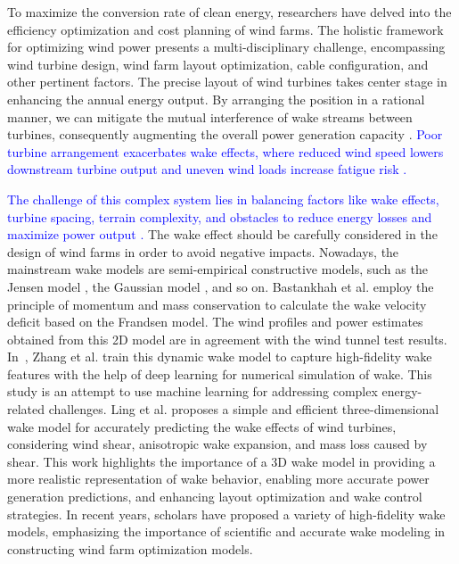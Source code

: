 \documentclass[journal,twoside]{IEEEtran}
\begin{document}
    To maximize the conversion rate of clean energy, researchers have delved into the efficiency optimization and cost planning of wind farms. The holistic framework for optimizing wind power presents a multi-disciplinary challenge, encompassing wind turbine design, wind farm layout optimization, cable configuration, and other pertinent factors. The precise layout of wind turbines takes center stage in enhancing the annual energy output. By arranging the position in a rational manner, we can mitigate the mutual interference of wake streams between turbines, consequently augmenting the overall power generation capacity \cite{howland2022operating}. \textcolor{blue}{Poor turbine arrangement exacerbates wake effects, where reduced wind speed lowers downstream turbine output and uneven wind loads increase fatigue risk \cite{howland2022collective,kitzing2020multifaceted}.} 
    
    \textcolor{blue}{The challenge of this complex system lies in balancing factors like wake effects, turbine spacing, terrain complexity, and obstacles to reduce energy losses and maximize power output \cite{tao2020nonuniform}.} The wake effect should be carefully considered in the design of wind farms in order to avoid negative impacts. Nowadays, the mainstream wake models are semi-empirical constructive models, such as the Jensen model \cite{shakoor2016wake} , the Gaussian model \cite{yu2023reinforcement}, and so on. Bastankhah et al. \cite{bastankhah2014new} employ the principle of momentum and mass conservation to calculate the wake velocity deficit based on the Frandsen model. The wind profiles and power estimates obtained from this 2D model are in agreement with the wind tunnel test results. In~\cite{zhang2020novel}, Zhang et al. train this dynamic wake model to capture high-fidelity wake features with the help of deep learning for numerical simulation of wake. This study is an attempt to use machine learning for addressing complex energy-related challenges. Ling et al. \cite{ling2023three} proposes a simple and efficient three-dimensional wake model for accurately predicting the wake effects of wind turbines, considering wind shear, anisotropic wake expansion, and mass loss caused by shear. This work highlights the importance of a 3D wake model in providing a more realistic representation of wake behavior, enabling more accurate power generation predictions, and enhancing layout optimization and wake control strategies. In recent years, scholars have proposed a variety of high-fidelity wake models, emphasizing the importance of scientific and accurate wake modeling in constructing wind farm optimization models.
    
\end{document}
